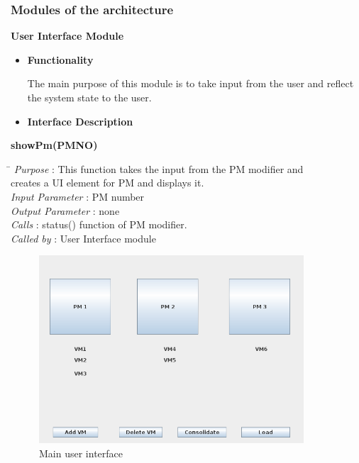 \documentclass[a4paper,11pt]{article}
\begin{document}
\subsubsection{Modules of the architecture }
\textbf{User Interface Module}
\begin{itemize}
 \item \textbf{Functionality}
 
 The main purpose of this module is to take input from the user and reflect the system state to the user.
  \item \textbf{Interface Description}
  \end{itemize}
  \textbf{showPm(PM\textunderscore NO)} 
\begin{tabbing}
\hspace*{4cm}\= \kill
 \textit{Purpose} \> : This function takes the input from the PM modifier and \\ \>creates a UI element for PM and displays it.\\
  \textit{Input Parameter} \> : PM number \\
  \textit{Output Parameter} \> : none \\
  \textit{Calls} \> : status() function of PM modifier. \\
  \textit{Called by} \> : User Interface module
  
\end{tabbing}
\begin{figure}[h]
\centering
\includegraphics[height=7cm]{images/GUI.png}
\caption{Main user interface}
\label{fig:GUI}
\end{figure}
\end{document}

